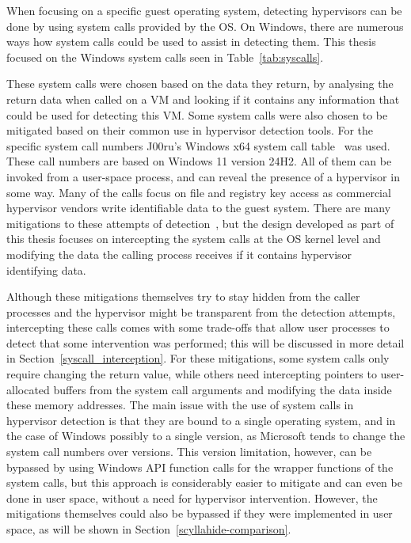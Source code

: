 When focusing on a specific guest operating system, detecting hypervisors can be done by using system calls provided by the OS. 
On Windows, there are numerous ways how system calls could be used to assist in detecting them. This thesis focused on the Windows system calls seen in Table~\ref{tab:syscalls}. 

These system calls were chosen based on the data they return, by analysing the return data when called on a VM and looking if it contains any information that could be used for detecting this VM. Some system calls were also chosen
to be mitigated based on their common use in hypervisor detection tools.
For the specific system call numbers J00ru's Windows x64 system call table~\cite{j00ruSyscalls} was used. These call numbers are based on Windows 11 version 24H2. All of them can be invoked from a user-space process, and can reveal the presence of a hypervisor in some way. 
Many of the calls focus on file and registry key access as commercial hypervisor vendors write identifiable data to the guest system. 
There are many mitigations to these attempts of detection~\cite{yang2024makingsyscallprivilegeright, 11027539}, but the design developed as part of this thesis focuses on intercepting the system calls at the OS kernel level 
and modifying the data the calling process receives if it contains hypervisor identifying data.

Although these mitigations themselves try to stay hidden from the caller processes and the hypervisor might be transparent from the detection attempts, intercepting these calls comes with some trade-offs that allow user processes to detect that
some intervention was performed; this will be discussed in more detail in Section~\ref{syscall_interception}.
For these mitigations, some system calls only require changing the return value, while others need intercepting pointers to user-allocated buffers from the system call arguments and modifying the data inside these memory addresses.
The main issue with the use of system calls in hypervisor detection is that they are bound to a single operating system, and in the case of Windows possibly to a single version, as Microsoft tends to change the system call numbers over versions.
This version limitation, however, can be bypassed by using Windows API function calls for the wrapper functions of the system calls, but this approach is considerably easier to mitigate and can even be done in user space, without a need for hypervisor intervention.
However, the mitigations themselves could also be bypassed if they were implemented in user space, as will be shown in Section~\ref{scyllahide-comparison}.

